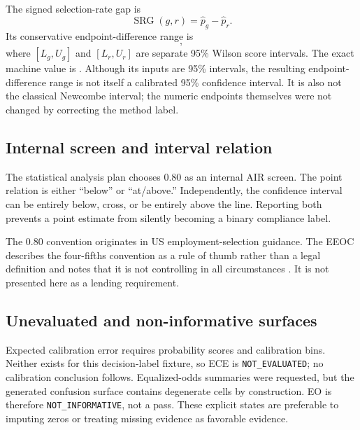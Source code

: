 The signed selection-rate gap is
\begin{equation}
  \operatorname{SRG}(g,r) = \widehat p_g - \widehat p_r.
  \label{eq:srg}
\end{equation}
Its conservative endpoint-difference range is
\begin{equation}
  [L_g-U_r,\; U_g-L_r],
  \label{eq:srg-interval}
\end{equation}
where $[L_g,U_g]$ and $[L_r,U_r]$ are separate 95\% Wilson score intervals. The exact machine
value is . Although its inputs are 95\% intervals,
the resulting endpoint-difference range is not itself a calibrated 95\% confidence interval. It is
also not the classical Newcombe interval; the numeric endpoints themselves were not changed by
correcting the method label.

\subsection{Internal screen and interval relation}

The statistical analysis plan chooses 0.80 as an internal AIR screen. The point relation is either
``below'' or ``at/above.'' Independently, the confidence interval can be entirely below, cross, or
be entirely above the line. Reporting both prevents a point estimate from silently becoming a
binary compliance label.

The 0.80 convention originates in US employment-selection guidance. The EEOC describes the
four-fifths convention as a rule of thumb rather than a legal definition and notes that it is not
controlling in all circumstances \citep{eeoc_uniform_guidelines}. It is not presented here as a
lending requirement.

\subsection{Unevaluated and non-informative surfaces}

Expected calibration error requires probability scores and calibration bins. Neither exists for
this decision-label fixture, so ECE is \texttt{NOT\_EVALUATED}; no calibration conclusion follows.
Equalized-odds summaries were requested, but the generated confusion surface contains degenerate
cells by construction. EO is therefore \texttt{NOT\_INFORMATIVE}, not a pass. These explicit states
are preferable to imputing zeros or treating missing evidence as favorable evidence.
